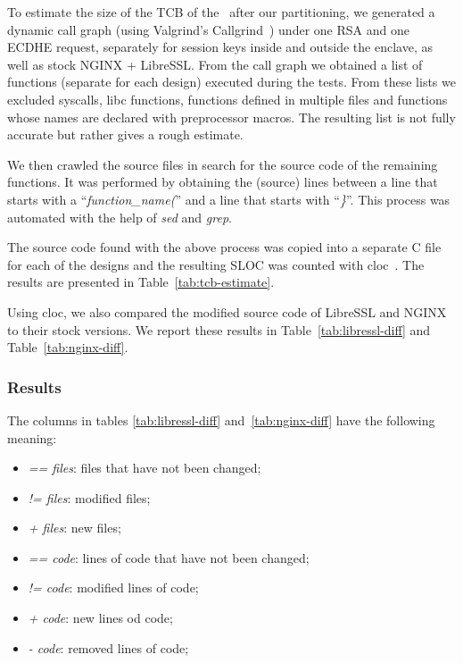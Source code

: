 \documentclass[../../../main.tex]{subfiles}
\begin{document}
\label{sec:tcb-analysis}
To estimate the size of the TCB of the \enclaveprogram~after our partitioning,
we generated a dynamic call graph (using Valgrind's
Callgrind~\cite{weidendorfer2004tool}) under one RSA and one ECDHE request,
separately for session keys inside and outside the enclave, as well as stock
NGINX + LibreSSL. From the call graph we obtained a list of functions
(separate for each design) executed during the tests. From these lists we
excluded syscalls, libc functions, functions defined in multiple files and
functions whose names are declared with preprocessor macros. The resulting list is not fully accurate but rather gives a rough estimate.

We then crawled the source files in search for the source code of the
remaining functions. It was performed by obtaining the (source) lines between
a line that starts with a ``\textit{function\_name(}'' and a line that starts
with ``\textit{\}}''. This process was automated with the help of \textit{sed}
and \textit{grep}.

The source code found with the above process was copied into a separate C file
for each of the designs and the resulting SLOC was counted with
cloc~\cite{cloc}. The results are presented in Table~\ref{tab:tcb-estimate}.

Using cloc, we also compared the modified source code of LibreSSL and NGINX to
their stock versions. We report these results in Table~\ref{tab:libressl-diff}
and Table~\ref{tab:nginx-diff}.

\subsubsection*{Results}
The columns in tables \ref{tab:libressl-diff} and~\ref{tab:nginx-diff} have
the following meaning:
\begin{itemize}
  \item \textit{\footnotesize == files}: files that have not been changed;
  \item \textit{\footnotesize != files}: modified files;
  \item \textit{\footnotesize + files}: new files;
  \item \textit{\footnotesize == code}: lines of code that have not been
    changed;
  \item \textit{\footnotesize != code}:  modified lines of code;
  \item \textit{\footnotesize + code}: new lines od code;
  \item \textit{\footnotesize - code}: removed lines of code;
\end{itemize}
\end{document}
